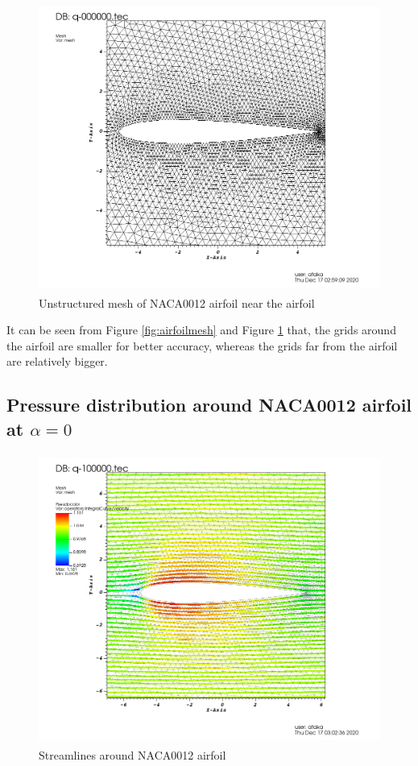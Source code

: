 \documentclass[letterpaper,12pt]{article}
\begin{document}
\begin{figure} [!h]
	\centering
	\includegraphics[height = 9.5cm]{graph/medium/medium_62650001.png}
	\caption{Unstructured mesh of NACA0012 airfoil near the airfoil}
    \label{fig:airfoilmeshclose}
\end{figure}

\vspace{1cm}

It can be seen from Figure \ref{fig:airfoilmesh} and Figure \ref{fig:airfoilmeshclose} that, the grids around
the airfoil are smaller for better accuracy, whereas the grids far from the airfoil are relatively bigger.
\newpage

\subsection{Pressure distribution around NACA0012 airfoil at $\alpha = 0$}

\begin{figure} [!h]
	\centering
	\includegraphics[height = 9.5cm]{graph/medium/medium_streamline0000.png}
	\caption{Streamlines around NACA0012 airfoil}
    \label{fig:airfoilstreamline}
\end{figure}
\end{document}
